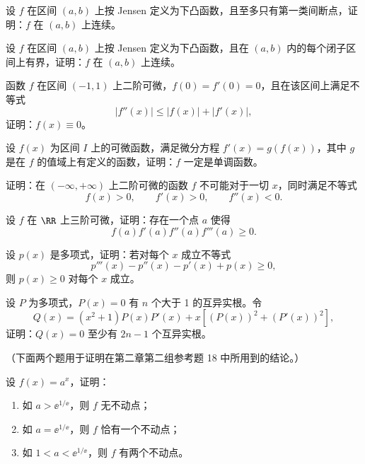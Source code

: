 \begin{xreferenceproblem}[9]
设 $f$ 在区间 $(a,b)$ 上按 Jensen 定义为下凸函数，且至多只有第一类间断点，证明：$f$ 在 $(a,b)$ 上连续。
\end{xreferenceproblem}

\begin{xreferenceproblem}[10]
设 $f$ 在区间 $(a,b)$ 上按 Jensen 定义为下凸函数，且在 $(a,b)$ 内的每个闭子区间上有界，证明：$f$ 在 $(a,b)$ 上连续。
\end{xreferenceproblem}

\begin{xreferenceproblem}[11]
函数 $f$ 在区间 $(-1,1)$ 上二阶可微，$f(0)=f'(0)=0$，且在该区间上满足不等式
  \[
    |f''(x)|\le|f(x)|+|f'(x)|,
  \]
  证明：$f(x)\equiv0$。
\end{xreferenceproblem}

\begin{xreferenceproblem}[12]
设 $f(x)$ 为区间 $I$ 上的可微函数，满足微分方程 $f'(x)=g(f(x))$，其中 $g$ 是在 $f$ 的值域上有定义的函数，证明：$f$ 一定是单调函数。
\end{xreferenceproblem}

\begin{xreferenceproblem}[13]
证明：在 $(-\infty,+\infty)$ 上二阶可微的函数 $f$ 不可能对于一切 $x$，同时满足不等式
  \[
    f(x)>0,\qquad f'(x)>0,\qquad f''(x)<0.
  \]
\end{xreferenceproblem}

\begin{xreferenceproblem}[14]
设 $f$ 在 $\RR$ 上三阶可微，证明：存在一个点 $a$ 使得
  \[
    f(a)f'(a)f''(a)f'''(a)\ge0.
  \]
\end{xreferenceproblem}

\begin{xreferenceproblem}[15]
设 $p(x)$ 是多项式，证明：若对每个 $x$ 成立不等式
  \[
    p'''(x)-p''(x)-p'(x)+p(x)\ge0,
  \]
  则 $p(x)\ge0$ 对每个 $x$ 成立。
\end{xreferenceproblem}

\begin{xreferenceproblem}[16]
设 $P$ 为多项式，$P(x)=0$ 有 $n$ 个大于 1 的互异实根。令
  \[
    Q(x)=(x^2+1)P(x)P'(x)+x[(P(x))^2+(P'(x))^2],
  \]
  证明：$Q(x)=0$ 至少有 $2n-1$ 个互异实根。

  （下面两个题用于证明在第二章第二组参考题 18 中所用到的结论。）
\end{xreferenceproblem}

\begin{xreferenceproblem}[17]
设 $f(x)=a^x$，证明：
  \begin{enumerate}[label=(\arabic*)]
    \item 如 $a>\ee^{1/\ee}$，则 $f$ 无不动点；
    \item 如 $a=\ee^{1/\ee}$，则 $f$ 恰有一个不动点；
    \item 如 $1<a<\ee^{1/\ee}$，则 $f$ 有两个不动点。
  \end{enumerate}
\end{xreferenceproblem}

